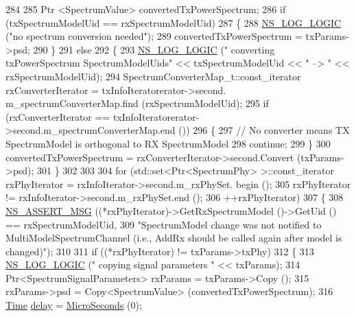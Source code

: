 \begin{DoxyCode}
284 
285       Ptr <SpectrumValue> convertedTxPowerSpectrum;
286       \textcolor{keywordflow}{if} (txSpectrumModelUid == rxSpectrumModelUid)
287         \{
288           \hyperlink{group__logging_ga88acd260151caf2db9c0fc84997f45ce}{NS\_LOG\_LOGIC} (\textcolor{stringliteral}{"no spectrum conversion needed"});
289           convertedTxPowerSpectrum = txParams->psd;
290         \}
291       \textcolor{keywordflow}{else}
292         \{
293           \hyperlink{group__logging_ga88acd260151caf2db9c0fc84997f45ce}{NS\_LOG\_LOGIC} (\textcolor{stringliteral}{" converting txPowerSpectrum SpectrumModelUids"} << txSpectrumModelUid 
      << \textcolor{stringliteral}{" --> "} << rxSpectrumModelUid);
294           SpectrumConverterMap\_t::const\_iterator rxConverterIterator = txInfoIteratorerator->second.
      m\_spectrumConverterMap.find (rxSpectrumModelUid);
295           \textcolor{keywordflow}{if} (rxConverterIterator == txInfoIteratorerator->second.m\_spectrumConverterMap.end ())
296             \{
297               \textcolor{comment}{// No converter means TX SpectrumModel is orthogonal to RX SpectrumModel}
298               \textcolor{keywordflow}{continue};
299             \}
300           convertedTxPowerSpectrum = rxConverterIterator->second.Convert (txParams->psd);
301         \}
302 
303 
304       \textcolor{keywordflow}{for} (std::set<Ptr<SpectrumPhy> >::const\_iterator rxPhyIterator = rxInfoIterator->second.m\_rxPhySet.
      begin ();
305            rxPhyIterator != rxInfoIterator->second.m\_rxPhySet.end ();
306            ++rxPhyIterator)
307         \{
308           \hyperlink{assert_8h_aff5ece9066c74e681e74999856f08539}{NS\_ASSERT\_MSG} ((*rxPhyIterator)->GetRxSpectrumModel ()->GetUid () == 
      rxSpectrumModelUid,
309                          \textcolor{stringliteral}{"SpectrumModel change was not notified to MultiModelSpectrumChannel (i.e., AddRx
       should be called again after model is changed)"});
310 
311           \textcolor{keywordflow}{if} ((*rxPhyIterator) != txParams->txPhy)
312             \{
313               \hyperlink{group__logging_ga88acd260151caf2db9c0fc84997f45ce}{NS\_LOG\_LOGIC} (\textcolor{stringliteral}{" copying signal parameters "} << txParams);
314               Ptr<SpectrumSignalParameters> rxParams = txParams->Copy ();
315               rxParams->psd = Copy<SpectrumValue> (convertedTxPowerSpectrum);
316               \hyperlink{namespacens3_1_1TracedValueCallback_a7ffd3e7c142ffe7c8a1d2db9b8de38ec}{Time} \hyperlink{lte_2model_2fading-traces_2fading__trace__generator_8m_a7964e6aa8f61a9d28973c8267a606ad8}{delay} = \hyperlink{group__timecivil_ga17465a639c8d1464e76538afdd78a9f0}{MicroSeconds} (0);

\end{DoxyCode}

